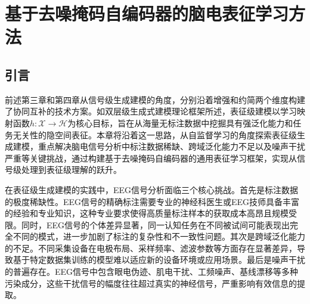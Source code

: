 \chapter{基于去噪掩码自编码器的脑电表征学习方法}
\section{引言}


前述第三章和第四章从信号级生成建模的角度，分别沿着增强和约简两个维度构建了协同互补的技术方案。如双层级生成式建模理论框架所述，表征级建模以学习映射函数$h:\mathcal{X}\to\mathcal{H}$为核心目标，旨在从海量无标注数据中挖掘具有强泛化能力和任务无关性的隐空间表征。本章将沿着这一思路，从自监督学习的角度探索表征级生成建模，重点解决脑电信号分析中标注数据稀缺、跨域泛化能力不足以及噪声干扰严重等关键挑战，通过构建基于去噪掩码自编码器的通用表征学习框架，实现从信号级处理到表征级理解的跃升。

在表征级生成建模的实践中，EEG信号分析面临三个核心挑战。首先是标注数据的极度稀缺性。EEG信号的精确标注需要专业的神经科医生或EEG技师具备丰富的经验和专业知识\cite{teplan2002fundamentals, tasci2023epilepsy, kaiboriboon2012EEG}，这种专业要求使得高质量标注样本的获取成本高昂且规模受限。同时，EEG信号的个体差异显著，同一认知任务在不同被试间可能表现出完全不同的模式，进一步加剧了标注的复杂性和不一致性问题。其次是跨域泛化能力的不足。不同采集设备在电极布局、采样频率、滤波参数等方面存在显著差异\cite{styles2021towards}，导致基于特定数据集训练的模型难以适应新的设备环境或应用场景。最后是噪声干扰的普遍存在。EEG信号中包含眼电伪迹、肌电干扰、工频噪声、基线漂移等多种污染成分\cite{pijn1991chaos, brake2024neurophysiological}，这些干扰信号的幅度往往超过真实的神经信号，严重影响有效信息的提取。

